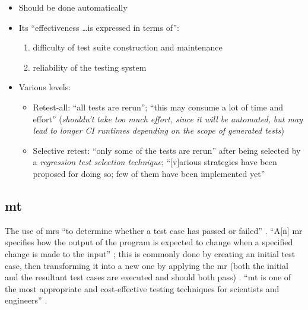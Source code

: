 \begin{itemize}
      \item Should be done automatically \cite[p.~481]{peters_software_2000}
      \item Its ``effectiveness \dots is expressed in terms of'':
            \begin{enumerate}
                  \item difficulty of test suite construction and maintenance
                  \item reliability of the testing system
                        \cite[pp.~481-482]{peters_software_2000}
            \end{enumerate}
      \item Various levels:
            \begin{itemize}
                  \item Retest-all: ``all tests are rerun''; ``this may consume
                        a lot of time and effort''
                        \cite[p.~411]{van_vliet_software_2000} (\emph{shouldn't
                              take too much effort, since it will be automated,
                              but may lead to longer CI runtimes depending on
                              the scope of generated tests})
                  \item Selective retest: ``only some of the tests are rerun''
                        after being selected by a \emph{regression test
                              selection technique}; ``[v]arious strategies have
                        been proposed for doing so; few of them have been
                        implemented yet'' \cite[p.~411]{van_vliet_software_2000}
            \end{itemize}
\end{itemize}

\subsection{\acf{mt}}
\label{chap:notes:sec:metamorphic-testing}
The use of \acfp{mr} ``to determine whether a test case has passed or failed''
\cite[p.~67]{kanewala_metamorphic_2019}. ``A[n] \acs{mr} specifies how the
output of the program is expected to change when a specified change is made to
the input'' \cite[p.~67]{kanewala_metamorphic_2019}; this is commonly done by
creating an initial test case, then transforming it into a new one by applying
the \acs{mr} (both the initial and the resultant test cases are executed and
should both pass) \cite[p.~68]{kanewala_metamorphic_2019}. ``\acs{mt} is one of
the most appropriate and cost-effective testing techniques for scientists and
engineers'' \cite[p.~72]{kanewala_metamorphic_2019}.

